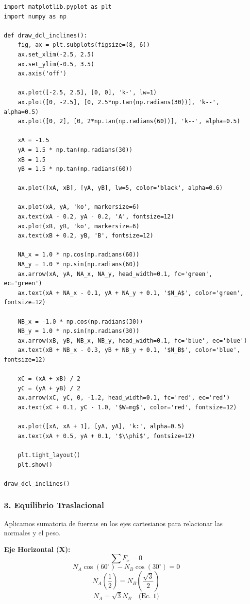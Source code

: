 \documentclass[12pt, a4paper]{article}
\begin{document}
\begin{lstlisting}
import matplotlib.pyplot as plt
import numpy as np

def draw_dcl_inclines():
    fig, ax = plt.subplots(figsize=(8, 6))
    ax.set_xlim(-2.5, 2.5)
    ax.set_ylim(-0.5, 3.5)
    ax.axis('off')

    ax.plot([-2.5, 2.5], [0, 0], 'k-', lw=1)
    ax.plot([0, -2.5], [0, 2.5*np.tan(np.radians(30))], 'k--', alpha=0.5)
    ax.plot([0, 2], [0, 2*np.tan(np.radians(60))], 'k--', alpha=0.5)

    xA = -1.5
    yA = 1.5 * np.tan(np.radians(30))
    xB = 1.5
    yB = 1.5 * np.tan(np.radians(60))

    ax.plot([xA, xB], [yA, yB], lw=5, color='black', alpha=0.6)
    
    ax.plot(xA, yA, 'ko', markersize=6)
    ax.text(xA - 0.2, yA - 0.2, 'A', fontsize=12)
    ax.plot(xB, yB, 'ko', markersize=6)
    ax.text(xB + 0.2, yB, 'B', fontsize=12)

    NA_x = 1.0 * np.cos(np.radians(60))
    NA_y = 1.0 * np.sin(np.radians(60))
    ax.arrow(xA, yA, NA_x, NA_y, head_width=0.1, fc='green', ec='green')
    ax.text(xA + NA_x - 0.1, yA + NA_y + 0.1, '$N_A$', color='green', fontsize=12)

    NB_x = -1.0 * np.cos(np.radians(30))
    NB_y = 1.0 * np.sin(np.radians(30))
    ax.arrow(xB, yB, NB_x, NB_y, head_width=0.1, fc='blue', ec='blue')
    ax.text(xB + NB_x - 0.3, yB + NB_y + 0.1, '$N_B$', color='blue', fontsize=12)

    xC = (xA + xB) / 2
    yC = (yA + yB) / 2
    ax.arrow(xC, yC, 0, -1.2, head_width=0.1, fc='red', ec='red')
    ax.text(xC + 0.1, yC - 1.0, '$W=mg$', color='red', fontsize=12)

    ax.plot([xA, xA + 1], [yA, yA], 'k:', alpha=0.5)
    ax.text(xA + 0.5, yA + 0.1, '$\\phi$', fontsize=12)

    plt.tight_layout()
    plt.show()

draw_dcl_inclines()
\end{lstlisting}

\subsubsection*{3. Equilibrio Traslacional}
Aplicamos sumatoria de fuerzas en los ejes cartesianos para relacionar las normales y el peso.

\textbf{Eje Horizontal (X):}
$$\sum F_x = 0$$
$$N_A \cos(60^\circ) - N_B \cos(30^\circ) = 0$$
$$N_A \left( \frac{1}{2} \right) = N_B \left( \frac{\sqrt{3}}{2} \right)$$
$$N_A = \sqrt{3} N_B \quad \text{(Ec. 1)}$$
\end{document}
